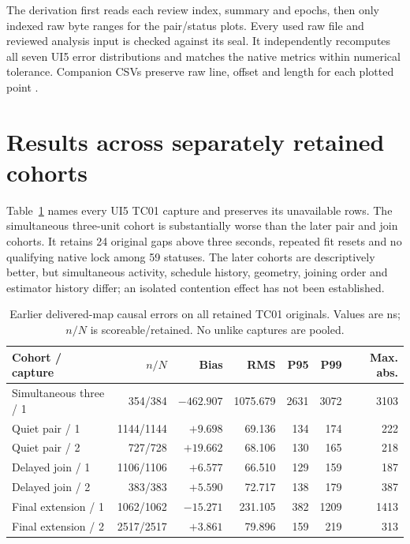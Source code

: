 \documentclass[11pt,letterpaper]{article}
\begin{document}
The derivation first reads each review index, summary and epochs, then only indexed raw byte ranges for the pair/status plots. Every used raw file and reviewed analysis input is checked against its seal. It independently recomputes all seven UI5 error distributions and matches the native metrics within numerical tolerance. Companion CSVs preserve raw line, offset and length for each plotted point \cite{evidence}.

\section{Results across separately retained cohorts}
Table~\ref{tab:error} names every UI5 TC01 capture and preserves its unavailable rows. The simultaneous three-unit cohort is substantially worse than the later pair and join cohorts. It retains 24 original gaps above three seconds, repeated fit resets and no qualifying native lock among 59 statuses. The later cohorts are descriptively better, but simultaneous activity, schedule history, geometry, joining order and estimator history differ; an isolated contention effect has not been established.

\begin{table}[h]\centering\small
\caption{Earlier delivered-map causal errors on all retained TC01 originals. Values are ns; $n/N$ is scoreable/retained. No unlike captures are pooled.}\label{tab:error}
\begin{tabular}{@{}lrrrrrr@{}}\toprule
Cohort / capture & $n/N$ & Bias & RMS & P95 & P99 & Max. abs.\\\midrule
Simultaneous three / 1 &354/384&$-462.907$&1075.679&2631&3072&3103\\
Quiet pair / 1 &1144/1144&$+9.698$&69.136&134&174&222\\
Quiet pair / 2 &727/728&$+19.662$&68.106&130&165&218\\
Delayed join / 1 &1106/1106&$+6.577$&66.510&129&159&187\\
Delayed join / 2 &383/383&$+5.590$&72.717&138&179&387\\
Final extension / 1 &1062/1062&$-15.271$&231.105&382&1209&1413\\
Final extension / 2 &2517/2517&$+3.861$&79.896&159&219&313\\\bottomrule
\end{tabular}
\end{table}
\end{document}
